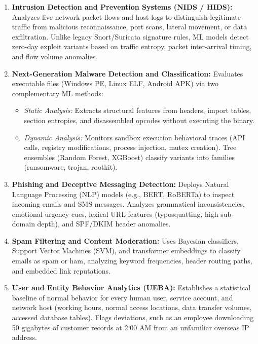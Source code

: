 \begin{enumerate}
\item \textbf{Intrusion Detection and Prevention Systems (NIDS / HIDS):}
Analyzes live network packet flows and host logs to distinguish legitimate traffic from malicious reconnaissance, port scans, lateral movement, or data exfiltration. Unlike legacy Snort/Suricata signature rules, ML models detect zero-day exploit variants based on traffic entropy, packet inter-arrival timing, and flow volume anomalies.

\item \textbf{Next-Generation Malware Detection and Classification:}
Evaluates executable files (Windows PE, Linux ELF, Android APK) via two complementary ML methods:
\begin{itemize}
\item \textit{Static Analysis:} Extracts structural features from headers, import tables, section entropies, and disassembled opcodes without executing the binary.
\item \textit{Dynamic Analysis:} Monitors sandbox execution behavioral traces (API calls, registry modifications, process injection, mutex creation). Tree ensembles (Random Forest, XGBoost) classify variants into families (ransomware, trojan, rootkit).
\end{itemize}

\item \textbf{Phishing and Deceptive Messaging Detection:}
Deploys Natural Language Processing (NLP) models (e.g., BERT, RoBERTa) to inspect incoming emails and SMS messages. Analyzes grammatical inconsistencies, emotional urgency cues, lexical URL features (typosquatting, high sub-domain depth), and SPF/DKIM header anomalies.

\item \textbf{Spam Filtering and Content Moderation:}
Uses Bayesian classifiers, Support Vector Machines (SVM), and transformer embeddings to classify emails as spam or ham, analyzing keyword frequencies, header routing paths, and embedded link reputations.

\item \textbf{User and Entity Behavior Analytics (UEBA):}
Establishes a statistical baseline of normal behavior for every human user, service account, and network host (working hours, normal access locations, data transfer volumes, accessed database tables). Flags deviations, such as an employee downloading 50 gigabytes of customer records at 2:00 AM from an unfamiliar overseas IP address.


\end{enumerate}

